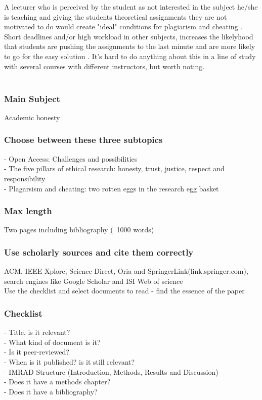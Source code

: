 \documentclass[12pt,a4paper]{article}
\begin{document}
A lecturer who is perceived by the student as not interested in the subject he/she is teaching and giving the students theoretical assignments they are not motivated to do would create "ideal" conditions for plagiarism and cheating \cite{Comas2010}. Short deadlines and/or high workload in other subjects, increases the likelyhood that students are pushing the assignments to the last minute and are more likely to go for the easy solution \cite{Comas2010}. It's hard to do anything about this in a line of study with several courses with different instructors, but worth noting.
\\ \\

\clearpage

\subsubsection*{Main Subject}
Academic honesty

\subsubsection*{Choose between these three subtopics}

- Open Access: Challenges and possibilities\\
- The five pillars of ethical research: honesty, trust, justice, respect and responsibility\\
- Plagarsism and cheating: two rotten eggs in the research egg basket
\subsubsection*{Max length}
Two pages including bibliography (~1000 words)
\subsubsection*{Use scholarly sources and cite them correctly}
ACM, IEEE Xplore, Science Direct, Oria and SpringerLink(link.springer.com), search engines like Google Scholar and ISI Web of science\\
Use the checklist and select documents to read - find the essence of the paper
\subsubsection*{Checklist}
- Title, is it relevant? \\
- What kind of document is it? \\
- Is it peer-reviewed? \\
- When is it published? is it still relevant?\\
- IMRAD Structure (Introduction, Methods, Results and Discussion)\\
- Does it have a methods chapter?\\
- Does it have a bibliography? \\
\end{document}
